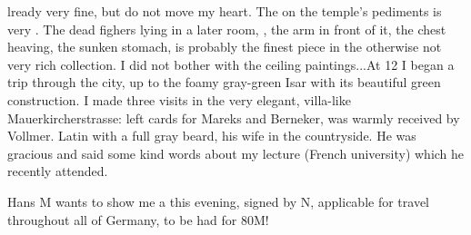  
lready very fine, but do not move my heart. The  on the temple's pediments is very . The dead fighers lying in a later room, , the arm in front of it, the chest heaving, the sunken stomach, is probably the finest piece in the otherwise not very rich collection. I did not bother with the ceiling paintings...At 12 I began a trip through the city, up to the foamy gray-green Isar with its beautiful green construction. I made three visits in the very elegant, villa-like Mauerkircherstrasse: left cards for Mareks and Berneker, was warmly received by Vollmer. Latin with a full gray beard, his wife in the countryside. He was gracious and said some kind words about my lecture (French university) which he recently attended.

Hans M wants to show me a  this evening, signed by N, applicable for travel throughout all of Germany, to be had for 80M!

\missing

%